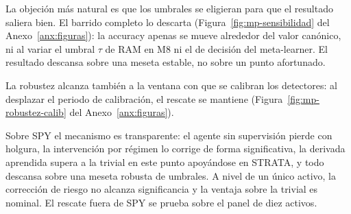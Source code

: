 La objeción más natural es que los umbrales se eligieran para que el resultado saliera bien. El barrido completo lo descarta (Figura~\ref{fig:mp-sensibilidad} del Anexo~\ref{anx:figuras}): la accuracy apenas se mueve alrededor del valor canónico, ni al variar el umbral $\tau$ de RAM en M8 ni el de decisión del meta-learner. El resultado descansa sobre una meseta estable, no sobre un punto afortunado.

La robustez alcanza también a la ventana con que se calibran los detectores: al desplazar el periodo de calibración, el rescate se mantiene (Figura~\ref{fig:mp-robustez-calib} del Anexo~\ref{anx:figuras}).

Sobre SPY el mecanismo es transparente: el agente sin supervisión pierde con holgura, la intervención por régimen lo corrige de forma significativa, la derivada aprendida supera a la trivial en este punto apoyándose en STRATA, y todo descansa sobre una meseta robusta de umbrales. A nivel de un único activo, la corrección de riesgo no alcanza significancia y la ventaja sobre la trivial es nominal. El rescate fuera de SPY se prueba sobre el panel de diez activos.
